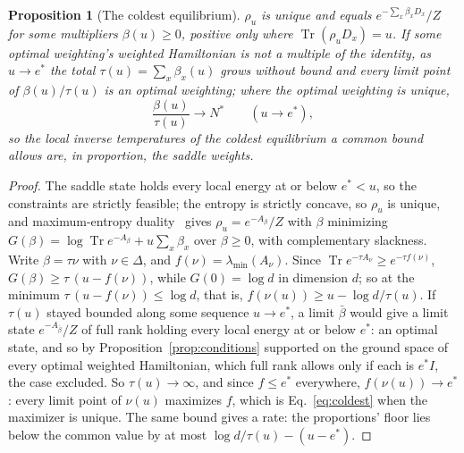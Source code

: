 \documentclass[aps,prd,reprint,superscriptaddress]{revtex4-2}
\newtheorem{proposition}{Proposition}
\begin{document}
\begin{proposition}[The coldest equilibrium]\label{prop:coldest}
$\rho_u$ is unique and equals $e^{-\sum_x \beta_x D_x}/Z$ for some multipliers $\beta(u) \ge 0$, positive only where $\operatorname{Tr}(\rho_u D_x) = u$. If some optimal weighting's weighted Hamiltonian is not a multiple of the identity, as $u \to e^*$ the total $\tau(u) = \sum_x \beta_x(u)$ grows without bound and every limit point of $\beta(u)/\tau(u)$ is an optimal weighting; where the optimal weighting is unique,
\begin{equation}
  \frac{\beta(u)}{\tau(u)} \to N^* \qquad (u \to e^*),
  \label{eq:coldest}
\end{equation}
so the local inverse temperatures of the coldest equilibrium a common bound allows are, in proportion, the saddle weights.
\end{proposition}
\begin{proof}
The saddle state holds every local energy at or below $e^* < u$, so the constraints are strictly feasible; the entropy is strictly concave, so $\rho_u$ is unique, and maximum-entropy duality~\cite{Jaynes1957,Jaynes1957b} gives $\rho_u = e^{-A_\beta}/Z$ with $\beta$ minimizing $G(\beta) = \log\operatorname{Tr}e^{-A_\beta} + u\sum_x\beta_x$ over $\beta \ge 0$, with complementary slackness. Write $\beta = \tau\nu$ with $\nu \in \Delta$, and $f(\nu) = \lambda_{\min}(A_\nu)$. Since $\operatorname{Tr}e^{-\tau A_\nu} \ge e^{-\tau f(\nu)}$, $G(\beta) \ge \tau\,(u - f(\nu))$, while $G(0) = \log d$ in dimension $d$; so at the minimum $\tau\,(u - f(\nu)) \le \log d$, that is, $f(\nu(u)) \ge u - \log d / \tau(u)$. If $\tau(u)$ stayed bounded along some sequence $u \to e^*$, a limit $\bar\beta$ would give a limit state $e^{-A_{\bar\beta}}/Z$ of full rank holding every local energy at or below $e^*$: an optimal state, and so by Proposition~\ref{prop:conditions} supported on the ground space of every optimal weighted Hamiltonian, which full rank allows only if each is $e^* I$, the case excluded. So $\tau(u) \to \infty$, and since $f \le e^*$ everywhere, $f(\nu(u)) \to e^*$: every limit point of $\nu(u)$ maximizes $f$, which is Eq.~\eqref{eq:coldest} when the maximizer is unique. The same bound gives a rate: the proportions' floor lies below the common value by at most $\log d / \tau(u) - (u - e^*)$.
\end{proof}
\end{document}

